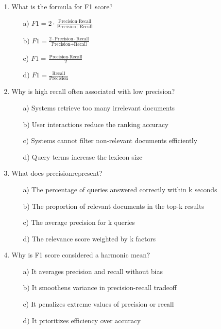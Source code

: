 \documentclass[8pt]{extarticle}
\begin{document}
\begin{multicols}{2}
\begin{enumerate}
\item What is the formula for F1 score?
\begin{itemize}
    \item [a)] $F1=2\cdot \frac{\text{Precision}\cdot \text{Recall}}{\text{Precision} + \text{Recall}}$ 
    \item [b)] $F1=\frac{2\cdot \text{Precision}\cdot \text{Recall}}{\text{Precision} + \text{Recall}}$
    \item [c)] $F1 = \frac{\text{Precision} \cdot \text{Recall}}{2}$
    \item [d)] $F1 = \frac{\text{Recall}}{\text{Precision}}$
\end{itemize}

\item Why is high recall often associated with low precision?
\begin{itemize}
\item[a)] Systems retrieve too many irrelevant documents
\item[b)] User interactions reduce the ranking accuracy
\item[c)] Systems cannot filter non-relevant documents efficiently
\item[d)] Query terms increase the lexicon size
\end{itemize}

\item What does precision\@k represent?
\begin{itemize}
\item[a)] The percentage of queries answered correctly within k seconds
\item[b)] The proportion of relevant documents in the top-k results
\item[c)] The average precision for k queries
\item[d)] The relevance score weighted by k factors
\end{itemize}

\item Why is F1 score considered a harmonic mean?
\begin{itemize}
\item[a)] It averages precision and recall without bias
\item[b)] It smoothens variance in precision-recall tradeoff
\item[c)] It penalizes extreme values of precision or recall
\item[d)] It prioritizes efficiency over accuracy
\end{itemize}


\end{enumerate}
\end{multicols}
\end{document}
